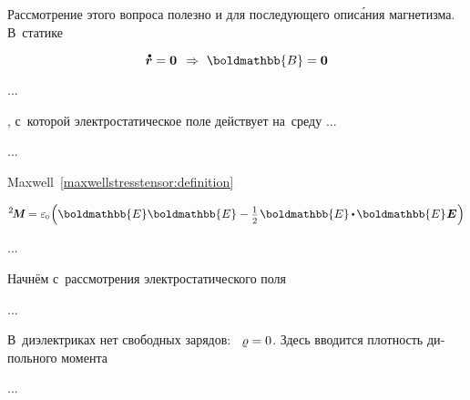 \begin{otherlanguage}{russian}

Рассмотрение этого вопроса полезно и для последующего опис\'{а}ния магнетизма.
В~статике

\nopagebreak\vspace{-0.2em}\begin{equation*}
\velocityofpoint = \bm{0}
\hspace{.44em} \Rightarrow \hspace{.33em}
\boldmathbb{B} = \bm{0}
\end{equation*}

...

  , с~которой электростатическое поле действует на~среду ...

...

Maxwell~\eqref{maxwellstresstensor:definition} 

\nopagebreak\vspace{-0.2em}\begin{equation*}
\maxwellstress = \vacuumpermittivity \hspace{-0.2ex} \left( \boldmathbb{E} \boldmathbb{E} - \smalldisplaystyleonehalf \hspace{.2ex} \boldmathbb{E} \hspace{-0.1ex} \dotp \hspace{-0.16ex} \boldmathbb{E} \hspace{.1ex} \UnitDyad \hspace{.1ex} \right)
\end{equation*}

...

\end{otherlanguage}



\begin{otherlanguage}{russian}

Начнём с~рассмотрения электростатического поля

...

В~диэлектриках нет свободных зарядов: ~${\varrho = 0}$.
Здесь вводится плотность дипольного момента

...


\end{otherlanguage}

